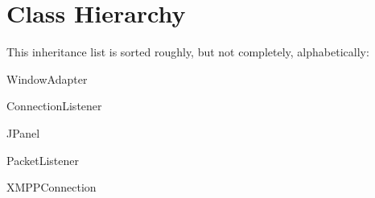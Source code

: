 \section{Class Hierarchy}
This inheritance list is sorted roughly, but not completely, alphabetically\-:\begin{DoxyCompactList}
\item {}
\item Window\-Adapter\begin{DoxyCompactList}
\item {}
\end{DoxyCompactList}
\item Connection\-Listener\begin{DoxyCompactList}
\item {}
\item {}
\end{DoxyCompactList}
\item J\-Panel\begin{DoxyCompactList}
\item {}
\end{DoxyCompactList}
\item Packet\-Listener\begin{DoxyCompactList}
\item {}
\item {}
\end{DoxyCompactList}
\item X\-M\-P\-P\-Connection\begin{DoxyCompactList}
\item {}
\end{DoxyCompactList}
\end{DoxyCompactList}
